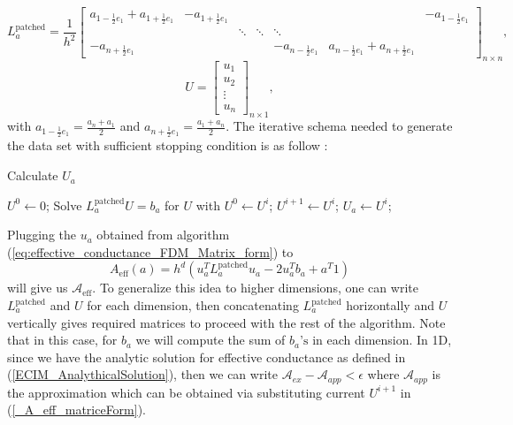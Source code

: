 \begin{equation*}
L_{a}^{\text{patched}} = \frac{1}{h^2}\begin{bmatrix}
a_{1 - \frac{1}{2}e_{1}} + a_{1 + \frac{1}{2}e_{1}}  &  -a_{1+\frac{1}{2}e_{1}} &  &  & & &-a_{1-\frac{1}{2}e_{1}}\\
&& \ddots& \ddots &\ddots  &&  \\
-a_{n+\frac{1}{2}e_{1}}&& & & -a_{n-\frac{1}{2}e_{1}} &a_{n-\frac{1}{2}e_{1}} + a_{n+\frac{1}{2}e_{1}}
\end{bmatrix}_{n \times n},
\end{equation*}
\begin{equation*}
U = \begin{bmatrix}
u_{1} \\
u_{2} \\
\vdots \\
u_{n}
\end{bmatrix}_{n \times 1},
\end{equation*}
with $a_{1-\frac{1}{2}e_{1}} = \frac{a_{n} + a_{1}}{2}$ and $a_{n+\frac{1}{2}e_{1}} = \frac{a_{1} + a_{n}}{2}$.
The iterative schema needed to generate the data set with sufficient stopping condition is as follow : 
\begin{algorithm}[H]
	\caption{Calculate $U_a$}
	\label{eq:effective_conductance_FDM_Matrix_form}
	\begin{algorithmic} 
		\State $U^0 \leftarrow 0$;
		\State Solve $L_a^{\text{patched}} U = b_a$ for $U$ with $U^0 \leftarrow U^i$;
		\State $U^{i+1} \leftarrow U^{i}$;
		\EndWhile
		\State $U_a \leftarrow U^{i}$;
	\end{algorithmic}
\end{algorithm}
Plugging the $u_a$ obtained from algorithm (\ref{eq:effective_conductance_FDM_Matrix_form}) to
\begin{equation}
\label{_A_eff_matriceForm}
A_{\text{eff}}(a) = h^d (u_{a}^{T} L_{a}^{\text{patched}} u_{a} - 2u_{a}^{T}b_a + a^T 1) 
\end{equation}
will give us $\mathscr{A}_{\text{eff}}$. To generalize this idea to higher dimensions, one can write $L_a^{\text{patched}}$ and $U$ for each dimension, then concatenating $L_a^{\text{patched}}$ horizontally and $U$ vertically gives required matrices to proceed with the rest of the algorithm. Note that in this case, for $b_a$ we will compute the sum of $b_a\text{'s}$ in each dimension. In 1D, since we have the analytic solution for effective conductance as defined in (\ref{ECIM_AnalythicalSolution}), then we can write $\mathscr{A}_{ex} - \mathscr{A}_{app} < \epsilon$ where $\mathscr{A}_{app}$ is the approximation which can be obtained via substituting current $U^{i+1}$ in (\ref{_A_eff_matriceForm}). 
